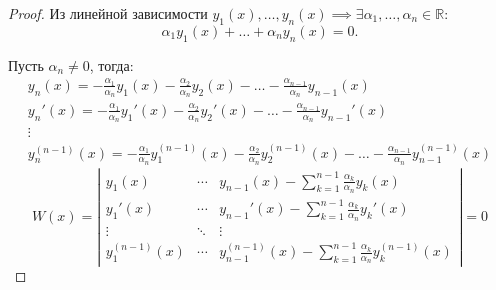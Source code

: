 \documentclass{report}
\theoremstyle{definition}
\begin{document}
\begin{proof}
    Из линейной зависимости $y_1(x),\ldots,y_n(x) \implies \exists \alpha_1,\ldots,\alpha_n \in \mathbb{R}$:
    \begin{equation*}
        \alpha_1y_1(x) + \ldots + \alpha_ny_n(x) = 0.
    \end{equation*}

    Пусть $\alpha_n \ne 0$, тогда:
    \begin{equation*}
        \begin{array}{l}
            y_n(x) = -\frac{\alpha_1}{\alpha_n}y_1(x) - \frac{\alpha_2}{\alpha_n}y_2(x) - \ldots - \frac{\alpha_{n-1}}{\alpha_n}y_{n-1}(x)     \\
            y_n'(x) = -\frac{\alpha_1}{\alpha_n}y_1'(x) - \frac{\alpha_2}{\alpha_n}y_2'(x) - \ldots - \frac{\alpha_{n-1}}{\alpha_n}y_{n-1}'(x) \\
            \vdots                                                                                                                             \\
            y_n^{(n-1)}(x) = -\frac{\alpha_1}{\alpha_n}y_1^{(n-1)}(x) - \frac{\alpha_2}{\alpha_n}y_2^{(n-1)}(x) - \ldots - \frac{\alpha_{n-1}}{\alpha_n}y_{n-1}^{(n-1)}(x)
        \end{array}
    \end{equation*}
    \begin{equation*}
        W(x) = \left|\begin{array}{ccc}
            y_1(x)         & \cdots & y_{n-1}(x) - \sum_{k=1}^{n-1}\frac{\alpha_k}{\alpha_n}y_k(x)                 \\
            y_1'(x)        & \cdots & y_{n-1}'(x) - \sum_{k=1}^{n-1}\frac{\alpha_k}{\alpha_n}y_k'(x)               \\
            \vdots         & \ddots & \vdots                                                                       \\
            y_1^{(n-1)}(x) & \cdots & y_{n-1}^{(n-1)}(x) - \sum_{k=1}^{n-1}\frac{\alpha_k}{\alpha_n}y_k^{(n-1)}(x)
        \end{array}\right| = 0
    \end{equation*}
\end{proof}
\end{document}
